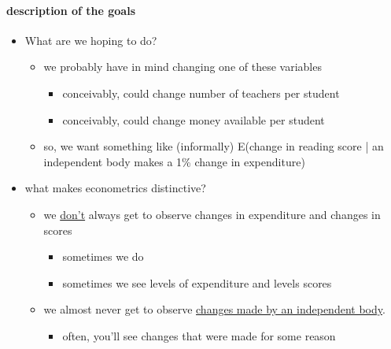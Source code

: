 \paragraph{description of the goals}
\begin{itemize}
\item What are we hoping to do?
\begin{itemize}
\item we probably have in mind changing one of these variables
\begin{itemize}
\item conceivably, could change number of teachers per student
\item conceivably, could change money available per student
\end{itemize}
\item so, we want something like (informally) E(change in reading
          score | an independent body makes a 1\% change in expenditure)
\end{itemize}
\item what makes econometrics distinctive?
\begin{itemize}
\item we \underline{don't} always get to observe changes in expenditure and
          changes in scores
\begin{itemize}
\item sometimes we do
\item sometimes we see levels of expenditure and levels scores
\end{itemize}
\item we almost never get to observe \underline{changes made by an independent           body}.
\begin{itemize}
\item often, you'll see changes that were made for some reason
\end{itemize}
\end{itemize}
\end{itemize}

